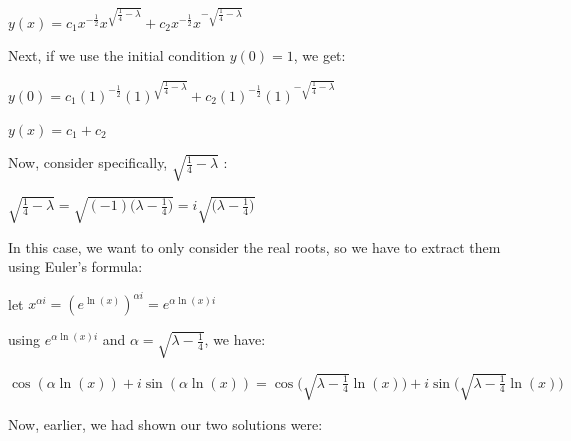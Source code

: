 \documentclass[executivepaper]{article}
\begin{document}
\begin{center}

$y(x)=c_{1}x^{-\frac{1}{2}}x^{\sqrt{\frac{1}{4}-\lambda}}+c_{2}x^{-\frac{1}{2}}x^{-\sqrt{\frac{1}{4}-\lambda}}$

\end{center}

Next, if we use the initial condition $y(0)=1$, we get:

\begin{center}

$y(0)=c_{1}(1)^{-\frac{1}{2}}(1)^{\sqrt{\frac{1}{4}-\lambda}}+c_{2}(1)^{-\frac{1}{2}}(1)^{-\sqrt{\frac{1}{4}-\lambda}}$

\hspace{1mm}

$y(x)=c_{1}+c_{2}$

\end{center}

Now, consider specifically, $\sqrt{\frac{1}{4}-\lambda}$ \vspace{1mm} :

\begin{center}

$\sqrt{\frac{1}{4}-\lambda}=\sqrt{(-1)\bigg(\lambda - \frac{1}{4}\bigg)}=i\sqrt{\bigg(\lambda - \frac{1}{4}\bigg)}$

\end{center}

In this case, we want to only consider the real roots, so we have to extract them using Euler's formula:

\begin{center}

let $x^{\alpha i}=(e^{\ln(x)})^{\alpha i}=e^{\alpha \ln(x) i}$

\hspace{1mm}

using $e^{\alpha \ln(x) i}$ and $\alpha=\sqrt{\lambda-\frac{1}{4}}$, we have:

\hspace{1mm}

$\cos(\alpha \ln(x))+i\sin(\alpha \ln(x))=\cos\bigg(\sqrt{\lambda-\frac{1}{4}} \ln(x)\bigg)+i\sin\bigg(\sqrt{\lambda-\frac{1}{4}} \ln(x)\bigg)$

\end{center}

\pagebreak

\vspace*{-40mm}

Now, earlier, we had shown our two solutions were:
\end{document}

